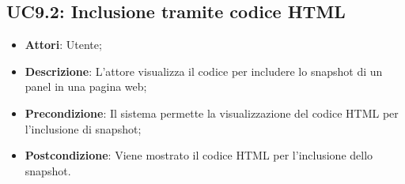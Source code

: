 \subsection{UC9.2: Inclusione tramite codice HTML}
\begin{itemize}
	\item \textbf{Attori}: Utente;
	\item \textbf{Descrizione}: L'attore visualizza il codice  per includere lo snapshot di un panel in una pagina web;
	\item \textbf{Precondizione}: Il sistema permette la visualizzazione del codice HTML per l'inclusione di snapshot;
	\item \textbf{Postcondizione}: Viene mostrato il codice HTML per l'inclusione dello snapshot.
\end{itemize}

